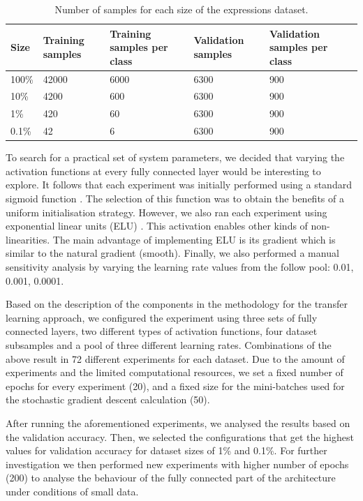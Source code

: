 \documentclass{article}
\begin{document}
\begin{table}[!htb]
  \centering
  \begin{tabular}{| l | l | l | l | l |}
    \hline
    \textbf{Size} & \textbf{Training samples} & \textbf{Training samples per class} & \textbf{Validation samples} & \textbf{Validation samples per class} \\ \hline
    100\% & 42000 & 6000 & 6300 & 900 \\ \hline
    10\% & 4200 & 600 & 6300 & 900 \\ \hline
    1\% & 420  & 60 & 6300 & 900 \\ \hline
    0.1\% & 42 & 6 & 6300 & 900 \\ \hline
  \end{tabular}
  \caption{Number of samples for each size of the expressions dataset.}
  \label{tab:ds_2}
\end{table}

To search for a practical set of system parameters, we decided that varying the activation functions at every fully connected layer would be interesting to explore. It follows that each experiment was initially performed using a standard sigmoid function \cite{hecht1992theory}. The selection of this function was to obtain the benefits of a uniform initialisation strategy. However, we also ran each experiment using exponential linear units (ELU) \cite{clevert2015fast}. This activation enables other kinds of non-linearities. The main advantage of implementing ELU is its gradient which is similar to the natural gradient (smooth). Finally, we also performed a manual sensitivity analysis by varying the learning rate values from the follow pool: 0.01, 0.001, 0.0001.

Based on the description of the components in the methodology for the transfer learning approach, we configured the experiment using three sets of fully connected layers, two different types of activation functions, four dataset subsamples and a pool of three different learning rates. Combinations of the above result in 72 different experiments for each dataset. Due to the amount of experiments and the limited computational resources, we set a fixed number of epochs for every experiment (20), and a fixed size for the mini-batches used for the stochastic gradient descent calculation (50).

After running the aforementioned experiments, we analysed the results based on the validation accuracy. Then, we selected the configurations that get the highest values for validation accuracy for dataset sizes of 1\% and 0.1\%. For further investigation we then performed new experiments with higher number of epochs (200) to analyse the behaviour of the fully connected part of the architecture under conditions of small data.
\end{document}
